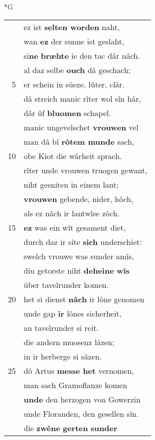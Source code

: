 \documentclass[8pt,a4paper,notitlepage]{article}
\begin{document}
\newpage
\begin{table}[ht]
\begin{minipage}[t]{0.5\linewidth}
\small
\begin{center}*G
\end{center}
\begin{tabular}{rl}
 & ez ist \textbf{selten worden} naht,\\ 
 & wan \textbf{ez} der sunne ist geslaht,\\ 
 & si\textbf{ne} \textbf{bræhte} ie den tac dâr nâch.\\ 
 & al daz selbe \textbf{ouch} dâ geschach;\\ 
5 & er schein in süeze, lûter, clâr.\\ 
 & dâ streich manic rîter wol sîn hâr,\\ 
 & dâr ûf \textbf{bluomen} schapel.\\ 
 & manic ungevelschet \textbf{vrouwen} vel\\ 
 & man dâ bî \textbf{rôtem munde} sach,\\ 
10 & obe Kiot die wârheit sprach.\\ 
 & rîter unde vrouwen truogen gewant,\\ 
 & niht gesniten in einem lant;\\ 
 & \textbf{vrouwen} gebende, nider, hôch,\\ 
 & als ez nâch ir lantwîse zôch.\\ 
15 & \textbf{ez} was ein wît gesament diet,\\ 
 & durch daz ir site \textbf{sich} underschiet:\\ 
 & swelch vrouwe was sunder amîs,\\ 
 & diu getorste niht \textbf{deheine wîs}\\ 
 & über tavelrunder komen.\\ 
20 & het si dienst \textbf{nâch} ir lône genomen\\ 
 & unde gap \textbf{ir} lônes sicherheit,\\ 
 & an tavelrunder si reit.\\ 
 & die andern muosenz lâzen;\\ 
 & in ir herberge si sâzen.\\ 
25 & dô Artus \textbf{messe het} vernomen,\\ 
 & man sach Gramoflanze komen\\ 
 & \textbf{unde} den herzogen von Gowerzin\\ 
 & unde Floranden, den gesellen sîn.\\ 
 & die \textbf{zwêne} \textbf{gerten} \textbf{sunder}\\ 

\end{tabular}
\end{minipage}
\end{table}
\end{document}
